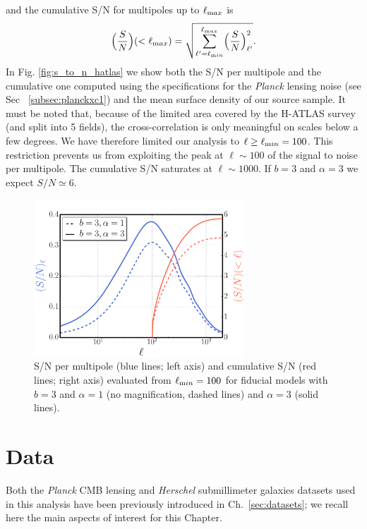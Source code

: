 and the cumulative S/N for multipoles up to $\ell_{\rm max}$ is
\begin{equation}
\label{eqn:s_to_n_cum}
\Bigl( \frac{S}{N} \Bigr)(<\ell_{\rm max}) = \sqrt{\sum_{\ell'=\ell_{\rm min}}^{\ell_{\rm max}} \Bigl( \frac{S}{N} \Bigr)^2_{\ell'}}.
\end{equation}
%
In Fig. \eqref{fig:s_to_n_hatlas} we show both the S/N per multipole and the cumulative one computed using the specifications for the \textit{Planck} lensing noise (see Sec ~\eqref{subsec:planckxc1}) and the mean surface density of our source sample. It must be noted that, because of the limited area covered by the H-ATLAS survey (and split into 5 fields), the cross-correlation is only meaningful on scales below a few degrees. We have therefore limited our analysis to $\ell \ge \ell_{\rm min} = 100$. This restriction prevents us from exploiting the peak at $\ell \sim 100$ of the signal to noise per multipole. The cumulative S/N saturates at $\ell \sim 1000$. If $b=3$ and $\alpha=3$ we expect $S/N \simeq 6$.

\begin{figure} %
\centering %
\includegraphics[width=0.7\textwidth]{Chapter3/Images/f2}
\caption{S/N per multipole (blue lines; left axis) and cumulative S/N (red lines; right axis) evaluated from $\ell_{\rm min}=100$ for fiducial models with $b=3$ and $\alpha=1$ (no magnification, dashed lines) and $\alpha=3$ (solid lines). \label{fig:s_to_n_hatlas}}
\end{figure}


\section{Data}
\label{sec:dataxc1}
Both the \textit{Planck} \gls{CMB} lensing and \textit{Herschel} submillimeter galaxies datasets used in this analysis have been previously introduced in Ch.~\eqref{sec:datasets}; we recall here the main aspects of interest for this Chapter.

